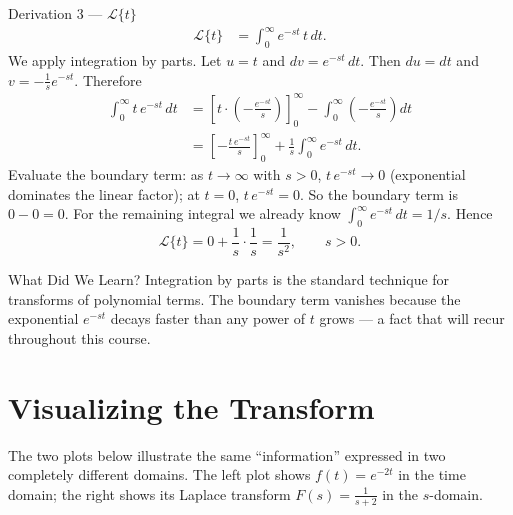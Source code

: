 \documentclass[12pt,a4paper]{article}
\begin{document}
\begin{infobox}{Derivation 3 --- $\mathcal{L}\{t\}$}
\begin{align*}
  \mathcal{L}\{t\}
  &= \int_0^\infty e^{-st}\, t\, dt.
\end{align*}
We apply integration by parts. Let $u = t$ and $dv = e^{-st}\, dt$. Then
$du = dt$ and $v = -\tfrac{1}{s}e^{-st}$. Therefore
\begin{align*}
  \int_0^\infty t\, e^{-st}\, dt
  &= \left[t \cdot \left(-\frac{e^{-st}}{s}\right)\right]_0^\infty
     - \int_0^\infty \left(-\frac{e^{-st}}{s}\right) dt \\[4pt]
  &= \left[-\frac{t\, e^{-st}}{s}\right]_0^\infty
     + \frac{1}{s}\int_0^\infty e^{-st}\, dt.
\end{align*}
Evaluate the boundary term: as $t \to \infty$ with $s > 0$,
$t\,e^{-st} \to 0$ (exponential dominates the linear factor); at $t = 0$,
$t\,e^{-st} = 0$. So the boundary term is $0 - 0 = 0$. For the remaining
integral we already know $\int_0^\infty e^{-st}\, dt = 1/s$. Hence
\[
  \mathcal{L}\{t\} = 0 + \frac{1}{s} \cdot \frac{1}{s} = \frac{1}{s^2},
  \qquad s > 0.
\]
\end{infobox}

\begin{learnbox}{What Did We Learn?}
Integration by parts is the standard technique for transforms of polynomial
terms. The boundary term vanishes because the exponential $e^{-st}$ decays
faster than any power of $t$ grows --- a fact that will recur throughout
this course.
\end{learnbox}

\section{Visualizing the Transform}

The two plots below illustrate the same ``information'' expressed in two
completely different domains. The left plot shows $f(t) = e^{-2t}$ in the
time domain; the right shows its Laplace transform $F(s) = \tfrac{1}{s+2}$
in the $s$-domain.
\end{document}
